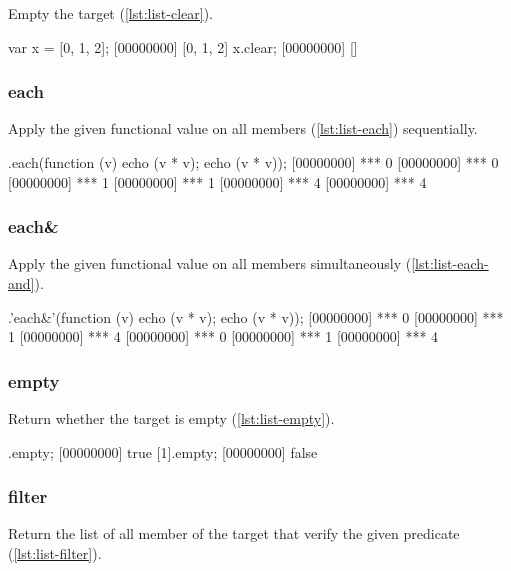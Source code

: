 Empty the target (\autoref{lst:list-clear}).

\begin{urbiscript}[caption=List.clear, label=lst:list-clear]
var x = [0, 1, 2];
[00000000] [0, 1, 2]
x.clear;
[00000000] []
\end{urbiscript}

\subsubsection{each}

Apply the given functional value on all members (\autoref{lst:list-each})
sequentially.

\begin{urbiscript}[caption=List.each, label=lst:list-each]
[0, 1, 2].each(function (v) {echo (v * v); echo (v * v)});
[00000000] *** 0
[00000000] *** 0
[00000000] *** 1
[00000000] *** 1
[00000000] *** 4
[00000000] *** 4
\end{urbiscript}

\subsubsection{each\&}

Apply the given functional value on all members simultaneously
(\autoref{lst:list-each-and}).

\begin{urbiscript}[caption=List.each, label=lst:list-each-and]
[0, 1, 2].'each&'(function (v) {echo (v * v); echo (v * v)});
[00000000] *** 0
[00000000] *** 1
[00000000] *** 4
[00000000] *** 0
[00000000] *** 1
[00000000] *** 4
\end{urbiscript}

\subsubsection{empty}

Return whether the target is empty (\autoref{lst:list-empty}).

\begin{urbiscript}[caption=List.empty, label=lst:list-empty]
[].empty;
[00000000] true
[1].empty;
[00000000] false
\end{urbiscript}

\subsubsection{filter}

Return the list of all member of the target that verify the given
predicate (\autoref{lst:list-filter}).

